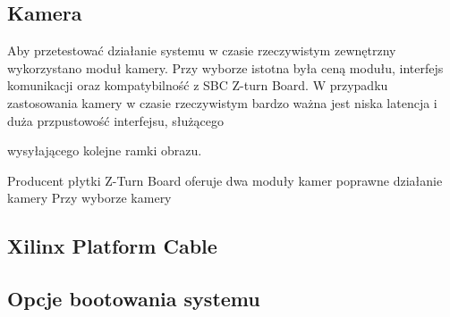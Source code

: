 \subsection{Kamera}

Aby przetestować działanie systemu w czasie rzeczywistym zewnętrzny wykorzystano moduł 
kamery. Przy wyborze istotna była ceną modułu, interfejs komunikacji oraz 
kompatybilność z SBC Z-turn Board. W przypadku zastosowania kamery w czasie 
rzeczywistym bardzo ważna jest niska latencja i duża przpustowość interfejsu, służącego 

wysyłającego kolejne ramki obrazu.  

Producent płytki Z-Turn Board oferuje dwa moduły kamer
poprawne działanie kamery 
Przy wyborze kamery 

\subsection{Xilinx Platform Cable}

\subsection{Opcje bootowania systemu}

